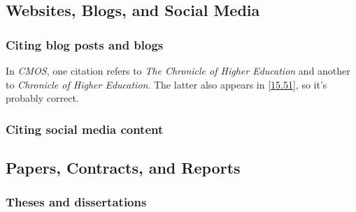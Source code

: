 \documentclass[11pt,letterpaper,oneside]{article}
\begin{document}
\begin{citebib}
\item \cite{zeitung1828}
\end{citebib}

\setcounter{subsection}{6}
\subsection{Websites, Blogs, and Social Media}
\setcounter{subsection}{14}

\setcounter{subsubsection}{207}
\subsubsection{Citing blog posts and blogs}
\label{14.208}

In \textit{CMOS}, one citation refers to \textit{The Chronicle of
Higher Education} and another to \textit{Chronicle of Higher
Education}. The latter also appears in \ref{15.51}, so it's probably
correct.

\begin{citebib}
\item \cite{amlen2015}
\item \cite{germano2017}
\item \cite{amlen}
\item \cite{linguafranca}
\item \cite{jim2017}
\end{citebib}

\subsubsection{Citing social media content}

\begin{citebib}
\item \cite{diaz2016}
\item \cite{obrien2015}
\item \cite{chicago2015}
\item \cite{licis2016}
\end{citebib}

\setcounter{subsection}{7}
\subsection{Papers, Contracts, and Reports}
\setcounter{subsection}{14}

\setcounter{subsubsection}{214}
\subsubsection{Theses and dissertations}
\end{document}
